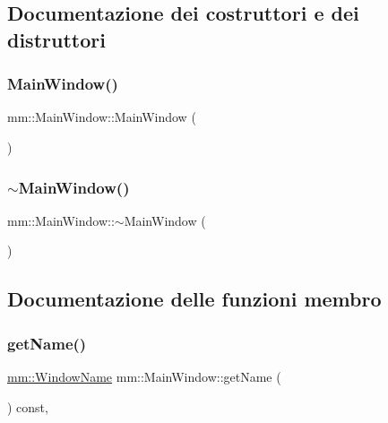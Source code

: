 \subsection{Documentazione dei costruttori e dei distruttori}
\mbox{\label{classmm_1_1_main_window_ae9a06c62e4efd9fce7334afb032e20d6}} 
\subsubsection{\texorpdfstring{Main\+Window()}{MainWindow()}}
{\footnotesize\ttfamily mm\+::\+Main\+Window\+::\+Main\+Window (\begin{DoxyParamCaption}{ }\end{DoxyParamCaption})}

\mbox{\label{classmm_1_1_main_window_a37132df8fb730f15d8eb75f07e5fd92d}} 
\subsubsection{\texorpdfstring{$\sim$\+Main\+Window()}{~MainWindow()}}
{\footnotesize\ttfamily mm\+::\+Main\+Window\+::$\sim$\+Main\+Window (\begin{DoxyParamCaption}{ }\end{DoxyParamCaption})\hspace{0.3cm}{\ttfamily [virtual]}}



\subsection{Documentazione delle funzioni membro}
\mbox{\label{classmm_1_1_main_window_a8cfdfeb6ad47afff06fa6b1b7fdc0c88}} 
\subsubsection{\texorpdfstring{get\+Name()}{getName()}}
{\footnotesize\ttfamily \mbox{\hyperlink{namespacemm_a4e9d92e04f65dbf2fc1963947da0d93c}{mm\+::\+Window\+Name}} mm\+::\+Main\+Window\+::get\+Name (\begin{DoxyParamCaption}{ }\end{DoxyParamCaption}) const\hspace{0.3cm}{\ttfamily [override]}, {\ttfamily [virtual]}}




